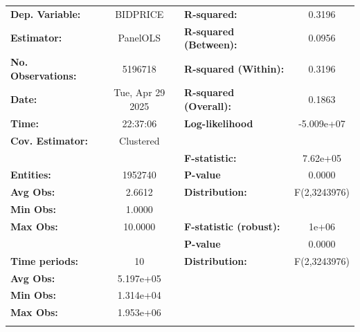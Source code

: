 \begin{center}
\begin{tabular}{lclc}
\toprule
\textbf{Dep. Variable:}     &      BIDPRICE      & \textbf{  R-squared:         }   &      0.3196      \\
\textbf{Estimator:}         &      PanelOLS      & \textbf{  R-squared (Between):}  &      0.0956      \\
\textbf{No. Observations:}  &      5196718       & \textbf{  R-squared (Within):}   &      0.3196      \\
\textbf{Date:}              &  Tue, Apr 29 2025  & \textbf{  R-squared (Overall):}  &      0.1863      \\
\textbf{Time:}              &      22:37:06      & \textbf{  Log-likelihood     }   &    -5.009e+07    \\
\textbf{Cov. Estimator:}    &     Clustered      & \textbf{                     }   &                  \\
\textbf{}                   &                    & \textbf{  F-statistic:       }   &     7.62e+05     \\
\textbf{Entities:}          &      1952740       & \textbf{  P-value            }   &      0.0000      \\
\textbf{Avg Obs:}           &       2.6612       & \textbf{  Distribution:      }   &   F(2,3243976)   \\
\textbf{Min Obs:}           &       1.0000       & \textbf{                     }   &                  \\
\textbf{Max Obs:}           &      10.0000       & \textbf{  F-statistic (robust):} &        1e+06     \\
\textbf{}                   &                    & \textbf{  P-value            }   &      0.0000      \\
\textbf{Time periods:}      &         10         & \textbf{  Distribution:      }   &   F(2,3243976)   \\
\textbf{Avg Obs:}           &     5.197e+05      & \textbf{                     }   &                  \\
\textbf{Min Obs:}           &     1.314e+04      & \textbf{                     }   &                  \\
\textbf{Max Obs:}           &     1.953e+06      & \textbf{                     }   &                  \\
\textbf{}                   &                    & \textbf{                     }   &                  \\

\end{tabular}
\end{center}
